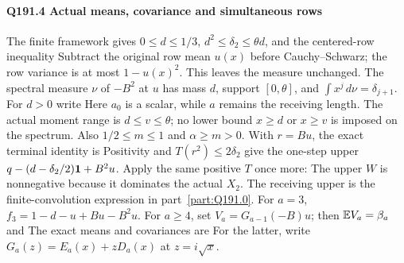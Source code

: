 \paragraph{Q191.4 Actual means, covariance and simultaneous rows}\label{part:Q191.4}
The finite framework gives $0\le\allowbreak  d\le\allowbreak 1/3$,
$d^2\le\allowbreak \delta_2\le\allowbreak \theta d$, and the centered-row inequality
Subtract the original row mean $u(x)$ before Cauchy--Schwarz; the row
variance is at most $1-u(x)^2$. This leaves the measure unchanged.
The spectral measure $\nu$ of $-B^2$ at $u$ has mass $d$, support
$[0,\allowbreak \theta]$, and $\int x^j\,\allowbreak d\nu=\allowbreak \delta_{j+1}$. For $d>\allowbreak 0$ write
Here $a_0$ is a scalar, while $a$ remains the receiving length. The actual
moment range is $d\le\allowbreak  v\le\allowbreak \theta$; no lower bound $x\ge\allowbreak  d$ or $x\ge\allowbreak  v$
is imposed on the spectrum. Also $1/2\le\allowbreak  m\le\allowbreak 1$ and $\alpha\ge\allowbreak  m>\allowbreak 0$.
With $r=\allowbreak Bu$, the exact terminal identity is
Positivity and $T(r^2)\le\allowbreak 2\delta_2$ give the one-step upper
$q-(d-\delta_2/2)\mathbf1+B^2u$. Apply the same positive $T$ once more:
The upper $W$ is nonnegative because it dominates the actual $X_2$.
The receiving upper is the finite-convolution expression in
part~\ref{part:Q191.0}. For $a=\allowbreak 3$,
$f_3=\allowbreak 1-d-u+Bu-B^2u$. For $a\ge\allowbreak 4$, set $V_a=\allowbreak G_{a-1}(-B)u$;
then $\mathbb E V_a=\allowbreak \beta_a$ and
The exact means and covariances are
For the latter, write $G_a(z)=\allowbreak E_a(x)+zD_a(x)$ at $z=\allowbreak i\sqrt x$.
